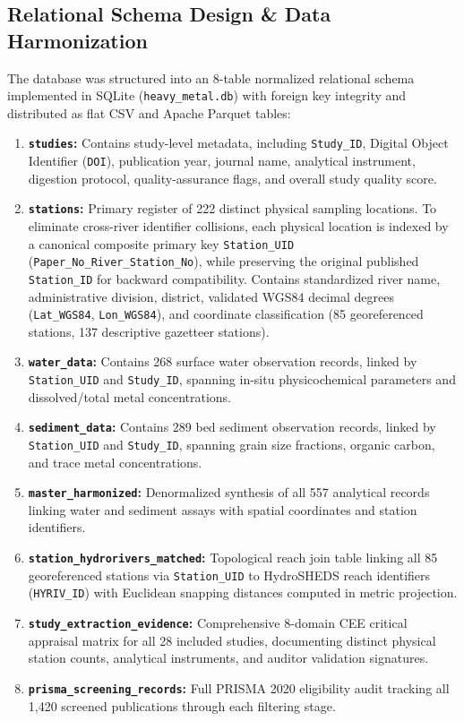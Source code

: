 \documentclass[11pt,a4paper]{article}
\begin{document}
\subsection*{Relational Schema Design \& Data Harmonization}
The database was structured into an 8-table normalized relational schema implemented in SQLite (\texttt{heavy\_metal.db}) with foreign key integrity and distributed as flat CSV and Apache Parquet tables:
\begin{enumerate}
    \item \textbf{\texttt{studies}:} Contains study-level metadata, including \texttt{Study\_ID}, Digital Object Identifier (\texttt{DOI}), publication year, journal name, analytical instrument, digestion protocol, quality-assurance flags, and overall study quality score.
    \item \textbf{\texttt{stations}:} Primary register of 222 distinct physical sampling locations. To eliminate cross-river identifier collisions, each physical location is indexed by a canonical composite primary key \texttt{Station\_UID} (\texttt{Paper\_No\_River\_Station\_No}), while preserving the original published \texttt{Station\_ID} for backward compatibility. Contains standardized river name, administrative division, district, validated WGS84 decimal degrees (\texttt{Lat\_WGS84}, \texttt{Lon\_WGS84}), and coordinate classification (85 georeferenced stations, 137 descriptive gazetteer stations).
    \item \textbf{\texttt{water\_data}:} Contains 268 surface water observation records, linked by \texttt{Station\_UID} and \texttt{Study\_ID}, spanning in-situ physicochemical parameters and dissolved/total metal concentrations.
    \item \textbf{\texttt{sediment\_data}:} Contains 289 bed sediment observation records, linked by \texttt{Station\_UID} and \texttt{Study\_ID}, spanning grain size fractions, organic carbon, and trace metal concentrations.
    \item \textbf{\texttt{master\_harmonized}:} Denormalized synthesis of all 557 analytical records linking water and sediment assays with spatial coordinates and station identifiers.
    \item \textbf{\texttt{station\_hydrorivers\_matched}:} Topological reach join table linking all 85 georeferenced stations via \texttt{Station\_UID} to HydroSHEDS reach identifiers (\texttt{HYRIV\_ID}) with Euclidean snapping distances computed in metric projection.
    \item \textbf{\texttt{study\_extraction\_evidence}:} Comprehensive 8-domain CEE critical appraisal matrix for all 28 included studies, documenting distinct physical station counts, analytical instruments, and auditor validation signatures.
    \item \textbf{\texttt{prisma\_screening\_records}:} Full PRISMA 2020 eligibility audit tracking all 1,420 screened publications through each filtering stage.
\end{enumerate}
\end{document}
